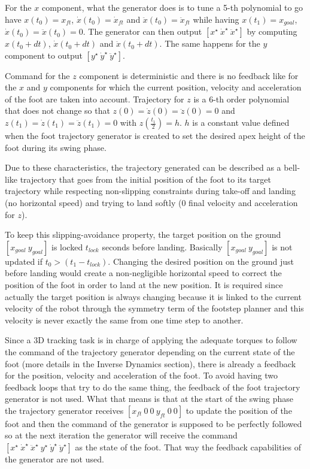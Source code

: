 \documentclass[a4paper,11pt]{article}
\begin{document}
For the $x$ component, what the generator does is to tune a 5-th polynomial to go have $x(t_0) = x_{ft}$, $\dot x(t_0) = \dot x_{ft}$ and $\ddot x(t_0) = \ddot x_{ft}$ while having $x(t_1) = x_{goal}$, $\dot x(t_0) = \ddot x(t_0) = 0$. The generator can then output $[x^\star ~ \dot x^\star ~ \ddot x^\star]$ by computing $x(t_0 + dt)$, $\dot x(t_0 + dt)$ and $\ddot x(t_0 + dt)$. The same happens for the $y$ component to output $[y^\star ~ \dot y^\star ~ \ddot y^\star]$.

Command for the $z$ component is deterministic and there is no feedback like for the $x$ and $y$ components for which the current position, velocity and acceleration of the foot are taken into account. Trajectory for $z$ is a 6-th order polynomial that does not change so that $z(0) = \dot z(0) = \ddot z(0) = 0$ and $z(t_1) = \dot z(t_1) = \ddot z(t_1) = 0$ with $z(\frac{t_1}{2}) = h$. $h$ is a constant value defined when the foot trajectory generator is created to set the desired apex height of the foot during its swing phase.

Due to these characteristics, the trajectory generated can be described as a bell-like trajectory that goes from the initial position of the foot to its target trajectory while respecting non-slipping constraints during take-off and landing (no horizontal speed) and trying to land softly (0 final velocity and acceleration for $z$).

To keep this slipping-avoidance property, the target position on the ground $[x_{goal} ~ y_{goal}]$ is locked $t_{lock}$ seconds before landing. Basically $[x_{goal} ~ y_{goal}]$ is not updated if $t_0 > (t_1-t_{lock})$. Changing the desired position on the ground just before landing would create a non-negligible horizontal speed to correct the position of the foot in order to land at the new position. It is required since actually the target position is always changing because it is linked to the current velocity of the robot through the symmetry term of the footstep planner and this velocity is never exactly the same from one time step to another. 

Since a 3D tracking task is in charge of applying the adequate torques to follow the command of the trajectory generator depending on the current state of the foot (more details in the Inverse Dynamics section), there is already a feedback for the position, velocity and acceleration of the foot. To avoid having two feedback loops that try to do the same thing, the feedback of the foot trajectory generator is not used. What that means is that at the start of the swing phase the trajectory generator receives $[x_{ft} ~ 0 ~ 0 ~ y_{ft} ~ 0 ~ 0]$ to update the position of the foot and then the command of the generator is supposed to be perfectly followed so at the next iteration the generator will receive the command $[x^\star ~ \dot x^\star ~ \ddot x^\star ~ y^\star ~ \dot y^\star ~ \ddot y^\star]$ as the state of the foot. That way the feedback capabilities of the generator are not used.
\end{document}
